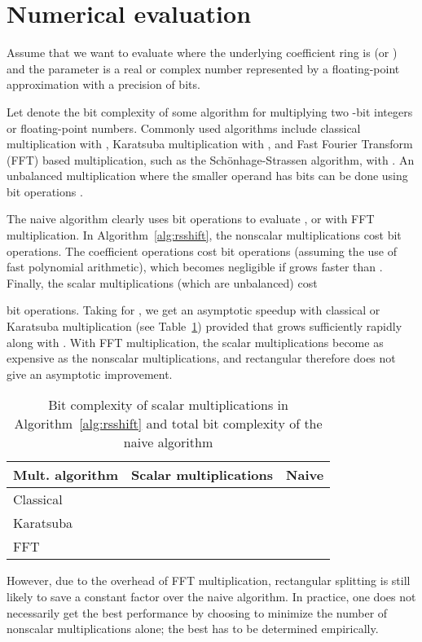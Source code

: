 \documentclass{sig-alternate}
\begin{document}
\section{Numerical evaluation} \label{sect:numerical}

Assume that we want to evaluate 
where the underlying coefficient ring is
 (or )
and the parameter  is a real or complex number
represented by a floating-point approximation with
a precision of  bits.

Let  denote the bit complexity of some algorithm
for multiplying two -bit integers or floating-point numbers. Commonly
used algorithms include classical multiplication with
, Karatsuba multiplication with
, and
Fast Fourier Transform (FFT) based multiplication,
such as the Sch\"{o}nhage-Strassen algorithm, with
.
An unbalanced multiplication where the smaller operand has
 bits can be done using
 bit operations \cite{mca}.

The naive algorithm clearly uses  bit operations
to evaluate , or  with FFT multiplication.
In Algorithm~\ref{alg:rsshift}, the nonscalar
multiplications cost  bit operations.
The coefficient operations cost 
bit operations (assuming the use of fast polynomial arithmetic),
which becomes negligible if  grows faster than .
Finally, the scalar multiplications (which are unbalanced) cost

bit operations.
Taking  for , we get
an asymptotic speedup with classical or Karatsuba multiplication
(see Table~\ref{tab:multalg})
provided that  grows sufficiently rapidly along with .
With FFT multiplication, the scalar multiplications
become as expensive as the nonscalar multiplications,
and rectangular therefore does not give an asymptotic
improvement.

\begin{table}[ht!]
\centering
\begin{tabular}{ l | l l }
Mult. algorithm & Scalar multiplications & Naive \\ \hline
Classical &    &  \\
Karatsuba &  &  \\
FFT       &            &  \\
\end{tabular}
\caption{Bit complexity of scalar multiplications in Algorithm~\ref{alg:rsshift}
and total bit complexity of the naive algorithm}
\label{tab:multalg}
\end{table}

However, due to the overhead of FFT multiplication,
rectangular splitting is still likely to save a constant
factor over the naive algorithm. In practice,
one does not necessarily get the best performance by choosing
 to minimize the number of nonscalar multiplications alone;
the best  has to be determined empirically.
\end{document}
